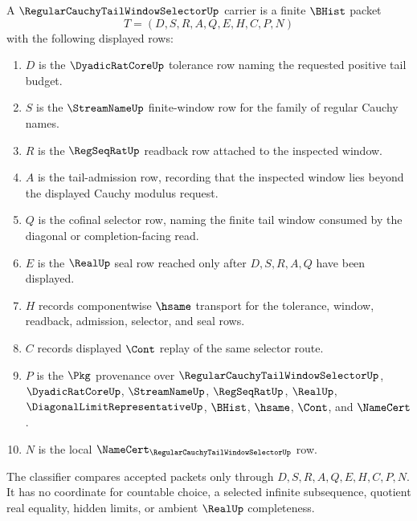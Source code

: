 \begin{definition}
\label{def:regular-cauchy-tail-window-selector-carrier}
A $\RegularCauchyTailWindowSelectorUp$ carrier is a finite $\BHist$ packet
$$
T=(D,S,R,A,Q,E,H,C,P,N)
$$
with the following displayed rows:
\begin{enumerate}
\item $D$ is the $\DyadicRatCoreUp$ tolerance row naming the requested positive tail budget.
\item $S$ is the $\StreamNameUp$ finite-window row for the family of regular Cauchy names.
\item $R$ is the $\RegSeqRatUp$ readback row attached to the inspected window.
\item $A$ is the tail-admission row, recording that the inspected window lies beyond the displayed Cauchy modulus request.
\item $Q$ is the cofinal selector row, naming the finite tail window consumed by the diagonal or completion-facing read.
\item $E$ is the $\RealUp$ seal row reached only after $D,S,R,A,Q$ have been displayed.
\item $H$ records componentwise $\hsame$ transport for the tolerance, window, readback, admission, selector, and seal rows.
\item $C$ records displayed $\Cont$ replay of the same selector route.
\item $P$ is the $\Pkg$ provenance over $\RegularCauchyTailWindowSelectorUp$, $\DyadicRatCoreUp$, $\StreamNameUp$, $\RegSeqRatUp$, $\RealUp$, $\DiagonalLimitRepresentativeUp$, $\BHist$, $\hsame$, $\Cont$, and $\NameCert$.
\item $N$ is the local $\NameCert_{\RegularCauchyTailWindowSelectorUp}$ row.
\end{enumerate}
The classifier compares accepted packets only through $D,S,R,A,Q,E,H,C,P,N$. It has no coordinate for countable choice, a selected infinite subsequence, quotient real equality, hidden limits, or ambient $\RealUp$ completeness.
\end{definition}

